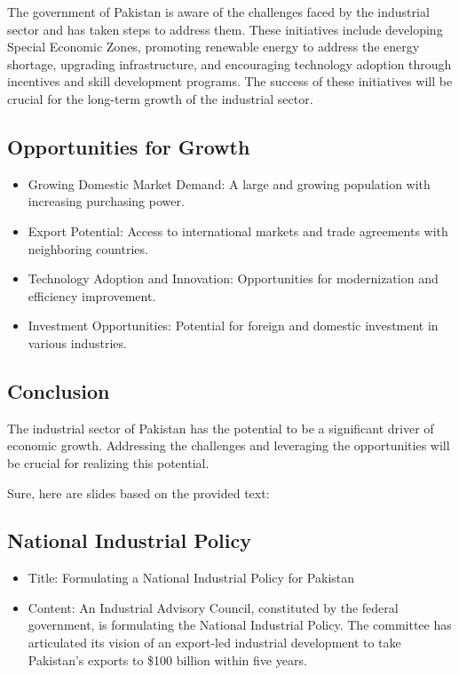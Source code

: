 \documentclass[
  letterpaper,
  DIV=11,
  numbers=noendperiod]{scrartcl}
\providecommand{\tightlist}{%
  \setlength{\itemsep}{0pt}\setlength{\parskip}{0pt}}\usepackage{longtable,booktabs,array}
\begin{document}
The government of Pakistan is aware of the challenges faced by the
industrial sector and has taken steps to address them. These initiatives
include developing Special Economic Zones, promoting renewable energy to
address the energy shortage, upgrading infrastructure, and encouraging
technology adoption through incentives and skill development programs.
The success of these initiatives will be crucial for the long-term
growth of the industrial sector.

\subsection{Opportunities for Growth}\label{opportunities-for-growth}

\begin{itemize}
\item
  Growing Domestic Market Demand: A large and growing population with
  increasing purchasing power.
\item
  Export Potential: Access to international markets and trade agreements
  with neighboring countries.
\item
  Technology Adoption and Innovation: Opportunities for modernization
  and efficiency improvement.
\item
  Investment Opportunities: Potential for foreign and domestic
  investment in various industries.
\end{itemize}

\subsection{Conclusion}\label{conclusion}

The industrial sector of Pakistan has the potential to be a significant
driver of economic growth. Addressing the challenges and leveraging the
opportunities will be crucial for realizing this potential.

Sure, here are slides based on the provided text:

\subsection{National Industrial
Policy}\label{national-industrial-policy}

\begin{itemize}
\tightlist
\item
  Title: Formulating a National Industrial Policy for Pakistan
\item
  Content: An Industrial Advisory Council, constituted by the federal
  government, is formulating the National Industrial Policy. The
  committee has articulated its vision of an export-led industrial
  development to take Pakistan's exports to \$100 billion within five
  years.
\end{itemize}
\end{document}
